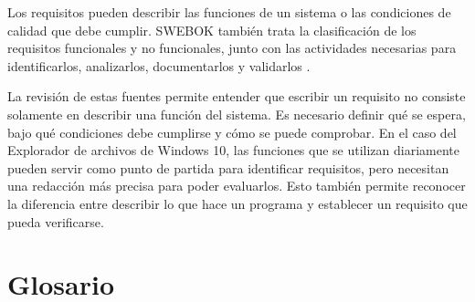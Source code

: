 \documentclass[10pt,a4paper]{article}
\begin{document}
Los requisitos pueden describir las funciones de un sistema o las condiciones de calidad que debe cumplir. SWEBOK también trata la clasificación de los requisitos funcionales y no funcionales, junto con las actividades necesarias para identificarlos, analizarlos, documentarlos y validarlos \cite[Cap.\ 1]{swebok2024}.

La revisión de estas fuentes permite entender que escribir un requisito no consiste solamente en describir una función del sistema. Es necesario definir qué se espera, bajo qué condiciones debe cumplirse y cómo se puede comprobar. En el caso del Explorador de archivos de Windows 10, las funciones que se utilizan diariamente pueden servir como punto de partida para identificar requisitos, pero necesitan una redacción más precisa para poder evaluarlos. Esto también permite reconocer la diferencia entre describir lo que hace un programa y establecer un requisito que pueda verificarse.

\section{Glosario}
\end{document}
